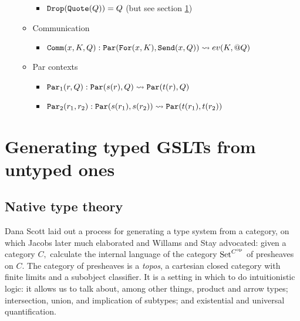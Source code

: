 \documentclass{article}
\begin{document}
\begin{itemize}
\begin{itemize}
\begin{itemize}
                \item ${\tt Drop}({\tt Quote}(Q)) = Q$ (but see section \ref{TypedGSLTs})
            \end{itemize}
        \item Communication
            \begin{itemize}
                \item ${\tt Comm}(x, K, Q) : {\tt Par}({\tt For}(x, K), {\tt Send}(x, Q)) \leadsto ev(K, @Q)$
            \end{itemize}
        \item Par contexts
            \begin{itemize}
                \item ${\tt Par}_1(r, Q) : {\tt Par}(s(r), Q) \leadsto {\tt Par}(t(r), Q)$
                \item ${\tt Par}_2(r_1, r_2) : {\tt Par}(s(r_1), s(r_2)) \leadsto {\tt Par}(t(r_1), t(r_2))$
            \end{itemize}
    \end{itemize}
\end{itemize}

\section{Generating typed GSLTs from untyped ones}
\label{TypedGSLTs}

\subsection{Native type theory}
Dana Scott
laid out a process for generating a type system from a category, on which Jacobs later much elaborated
and Willams and Stay advocated:
given a category $C,$ calculate the internal language of the category ${\rm Set}^{C^{\rm op}}$ of presheaves on $C.$  The category of presheaves is a {\em topos}, a cartesian closed category with finite limits and a subobject classifier.  It is a setting in which to do intuitionistic logic: it allows us to talk about, among other things, product and arrow types; intersection, union, and implication of subtypes; and existential and universal quantification.  
\end{document}
